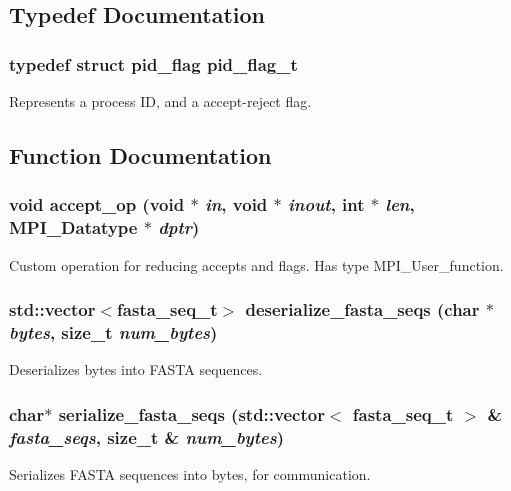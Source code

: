 \subsection{Typedef Documentation}
\subsubsection{\setlength{\rightskip}{0pt plus 5cm}typedef struct {\bf pid\_\-flag}  {\bf pid\_\-flag\_\-t}}\label{bm__comm_8h_a0}


Represents a process ID, and a accept-reject flag. 

\subsection{Function Documentation}
\subsubsection{\setlength{\rightskip}{0pt plus 5cm}void accept\_\-op (void $\ast$ {\em in}, void $\ast$ {\em inout}, int $\ast$ {\em len}, MPI\_\-Datatype $\ast$ {\em dptr})}\label{bm__comm_8h_a3}


Custom operation for reducing accepts and flags. Has type MPI\_\-User\_\-function. 
\subsubsection{\setlength{\rightskip}{0pt plus 5cm}std::vector$<${\bf fasta\_\-seq\_\-t}$>$ deserialize\_\-fasta\_\-seqs (char $\ast$ {\em bytes}, size\_\-t {\em num\_\-bytes})}\label{bm__comm_8h_a2}


Deserializes bytes into FASTA sequences. 
\subsubsection{\setlength{\rightskip}{0pt plus 5cm}char$\ast$ serialize\_\-fasta\_\-seqs (std::vector$<$ {\bf fasta\_\-seq\_\-t} $>$ \& {\em fasta\_\-seqs}, size\_\-t \& {\em num\_\-bytes})}\label{bm__comm_8h_a1}


Serializes FASTA sequences into bytes, for communication. 